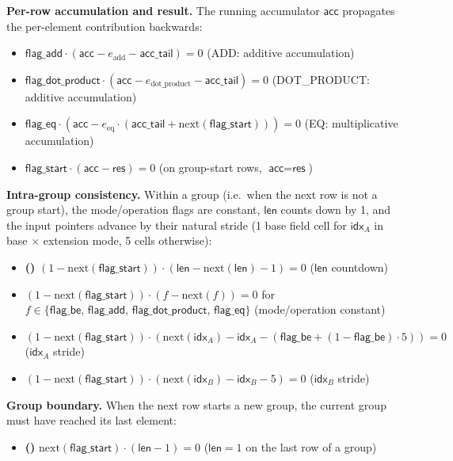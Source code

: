 \documentclass{article}
\theoremstyle{definition}
\begin{document}
\textbf{Per-row accumulation and result.} The running accumulator $\textsf{acc}$ propagates the per-element contribution backwards:
\begin{itemize}
    \item $\textsf{flag\_add} \cdot (\textsf{acc} - e_\text{add} - \textsf{acc\_tail}) = 0$ \hfill (ADD: additive accumulation)
    \item $\textsf{flag\_dot\_product} \cdot (\textsf{acc} - e_\text{dot\_product} - \textsf{acc\_tail}) = 0$ \hfill (DOT\_PRODUCT: additive accumulation)
    \item $\textsf{flag\_eq} \cdot (\textsf{acc} - e_\text{eq} \cdot (\textsf{acc\_tail} + \text{next}(\textsf{flag\_start}))) = 0$ \hfill (EQ: multiplicative accumulation)
    \item $\textsf{flag\_start} \cdot (\textsf{acc} - \textsf{res}) = 0$ \hfill (on group-start rows, $\textsf{acc} = \textsf{res}$)
\end{itemize}

\textbf{Intra-group consistency.} Within a group (i.e.\ when the next row is not a group start), the mode/operation flags are constant, $\textsf{len}$ counts down by 1, and the input pointers advance by their natural stride (1 base field cell for $\textsf{idx}_A$ in base $\times$ extension mode, 5 cells otherwise):
\begin{itemize}
    \item {}\textbf{(\theequation)}\label{c:len-countdown}\hspace{1mm} $(1 - \text{next}(\textsf{flag\_start})) \cdot (\textsf{len} - \text{next}(\textsf{len}) - 1) = 0$ \hfill ($\textsf{len}$ countdown)
    \item $(1 - \text{next}(\textsf{flag\_start})) \cdot (f - \text{next}(f)) = 0$ for $f \in \{\textsf{flag\_be},\, \textsf{flag\_add},\, \textsf{flag\_dot\_product},\, \textsf{flag\_eq}\}$ \hfill (mode/operation constant)
    \item $(1 - \text{next}(\textsf{flag\_start})) \cdot (\text{next}(\textsf{idx}_A) - \textsf{idx}_A - (\textsf{flag\_be} + (1 - \textsf{flag\_be}) \cdot 5)) = 0$ \hfill ($\textsf{idx}_A$ stride)
    \item $(1 - \text{next}(\textsf{flag\_start})) \cdot (\text{next}(\textsf{idx}_B) - \textsf{idx}_B - 5) = 0$ \hfill ($\textsf{idx}_B$ stride)
\end{itemize}

\textbf{Group boundary.} When the next row starts a new group, the current group must have reached its last element:
\begin{itemize}
    \item {}\textbf{(\theequation)}\label{c:len-boundary}\hspace{1mm} $\text{next}(\textsf{flag\_start}) \cdot (\textsf{len} - 1) = 0$ \hfill ($\textsf{len} = 1$ on the last row of a group)
\end{itemize}
\end{document}
